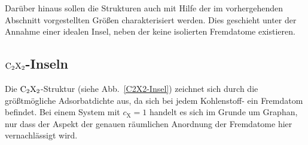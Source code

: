 \documentclass[a4paper, 10pt, twoside, openany]{book} %
\def \cX {c_\mathrm{X}}
\begin{document}
Darüber hinaus sollen die Strukturen auch mit Hilfe der im vorhergehenden Abschnitt vorgestellten Größen charakterisiert werden. Dies geschieht unter der Annahme einer idealen Insel, neben der keine isolierten Fremdatome existieren.

\subsection{$\rm C_2X_2$-Inseln}

Die $\rm C_2X_2$-Struktur (siehe Abb.~\ref{C2X2-Insel}) zeichnet sich durch die größtmögliche Adsorbatdichte aus, da sich bei jedem Kohlenstoff- ein Fremdatom befindet. Bei einem System mit $\cX = 1$ handelt es sich im Grunde um Graphan, nur dass der Aspekt der genauen räumlichen Anordnung der Fremdatome hier vernachlässigt wird.
\end{document}
